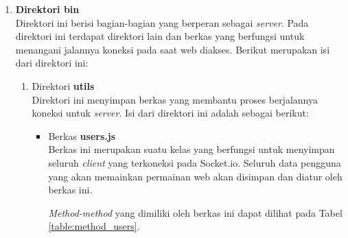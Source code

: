 \begin{enumerate}
	\item \textbf{Direktori bin} \\
	Direktori ini berisi bagian-bagian yang berperan sebagai \textit{server}. Pada direktori ini terdapat direktori lain dan berkas yang berfungsi untuk menangani jalannya koneksi pada saat web diakses. Berikut merupakan isi dari direktori ini:
	\begin{enumerate}
		\item Direktori \textbf{utils} \\
		Direktori ini menyimpan berkas yang membantu proses berjalannya koneksi untuk \textit{server}. Isi dari direktori ini adalah sebagai berikut:
		\begin{itemize}
			\item Berkas \textbf{users.js}  \\
			Berkas ini merupakan suatu kelas yang berfungsi untuk menyimpan seluruh \textit{client} yang terkoneksi pada Socket.io. Seluruh data pengguna yang akan memainkan permainan web akan disimpan dan diatur oleh berkas ini.
			
%			
%			
			
			\textit{Method-method} yang dimiliki oleh berkas ini dapat dilihat pada Tabel \ref{table:method_users}.
			

\end{itemize}
\end{enumerate}
\end{enumerate}
